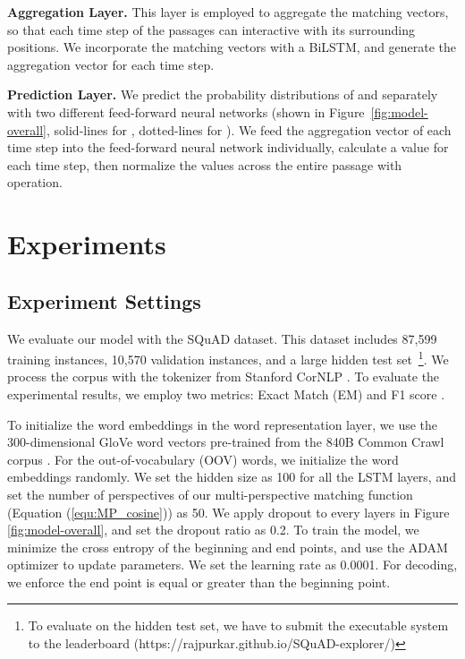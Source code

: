 \documentclass[11pt,letterpaper]{article}
\begin{document}
\textbf{Aggregation Layer.} 
This layer is employed to aggregate the matching vectors, so that each time step of the passages can interactive with its surrounding positions. We incorporate the matching vectors with a BiLSTM, and generate the aggregation vector for each time step.

\textbf{Prediction Layer.} 
We predict the probability distributions of  and  separately 
with two different feed-forward neural networks (shown in Figure~\ref{fig:model-overall}, solid-lines for ,
dotted-lines for ).
We feed the aggregation vector of each time step into the feed-forward neural network individually, calculate a value for each time step, 
then normalize the values across the entire passage with  operation. 



\section{Experiments}
\label{sec:experiments}

\subsection{Experiment Settings}
We evaluate our model with the SQuAD dataset. This dataset includes 87,599 training instances, 10,570 validation instances, and a large hidden test set~\footnote{To evaluate on the hidden test set, we have to submit the executable system to the leaderboard (https://rajpurkar.github.io/SQuAD-explorer/)}. We process the corpus with the tokenizer from Stanford CorNLP \cite{manning-EtAl:2014:P14-5}. To evaluate the experimental results, we employ two metrics: Exact Match (EM) and F1 score \cite{rajpurkar2016squad}.

To initialize the word embeddings in the word representation layer, we use the 300-dimensional GloVe word vectors pre-trained from the 840B Common Crawl corpus \cite{pennington2014glove}. For the out-of-vocabulary (OOV) words, we initialize the word embeddings randomly. We set the hidden size as 100 for all the LSTM layers, and set the number of perspectives  of our multi-perspective matching function (Equation (\ref{equ:MP_cosine})) as 50. We apply dropout to every layers in Figure \ref{fig:model-overall}, and set the dropout ratio as 0.2. To train the model, we minimize the cross entropy of the beginning and end points, and use the ADAM optimizer \cite{kingma2014adam} to update parameters. We set the learning rate as 0.0001. For decoding, we enforce the end point is equal or greater than the beginning point.
\end{document}

